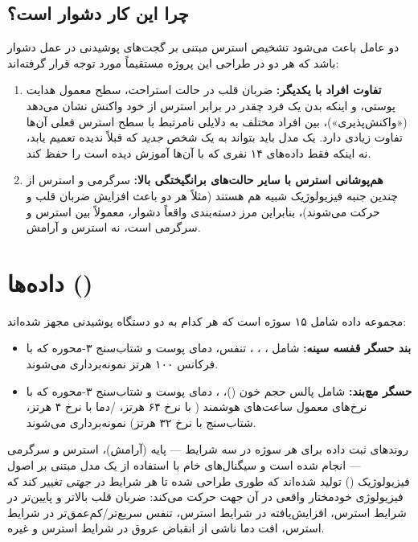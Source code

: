 \documentclass[12pt,a4paper]{article}
\begin{document}
\subsection{چرا این کار دشوار است؟}
دو عامل باعث می‌شود تشخیص استرس مبتنی بر گجت‌های پوشیدنی در عمل دشوار باشد که هر دو در طراحی این پروژه مستقیماً مورد توجه قرار گرفته‌اند:
\begin{enumerate}
    \item \textbf{تفاوت افراد با یکدیگر:} ضربان قلب در حالت استراحت، سطح معمول هدایت پوستی، و اینکه بدن یک فرد چقدر در برابر استرس از خود واکنش نشان می‌دهد («واکنش‌پذیری»)، بین افراد مختلف به دلایلی نامرتبط با سطح استرس فعلی آن‌ها تفاوت زیادی دارد. یک مدل باید بتواند به یک شخص \textit{جدید} که قبلاً ندیده تعمیم یابد، نه اینکه فقط داده‌های ۱۴ نفری که با آن‌ها آموزش دیده است را حفظ کند.
    \item \textbf{هم‌پوشانی استرس با سایر حالت‌های برانگیختگی بالا:} سرگرمی و استرس از چندین جنبه فیزیولوژیک شبیه هم هستند (مثلاً هر دو باعث افزایش ضربان قلب و حرکت می‌شوند)، بنابراین مرز دسته‌بندی واقعاً دشوار، معمولاً بین استرس و سرگرمی است، نه استرس و آرامش.
\end{enumerate}


\section{داده‌ها ()}
مجموعه داده شامل ۱۵ سوژه است که هر کدام به دو دستگاه پوشیدنی مجهز شده‌اند:
\begin{itemize}
    \item \textbf{بند حسگر قفسه سینه:} شامل ، ، ، تنفس، دمای پوست و شتاب‌سنج ۳-محوره که با فرکانس ۱۰۰ هرتز نمونه‌برداری می‌شوند.
    \item \textbf{حسگر مچ‌بند:} شامل پالس حجم خون ()، ، دمای پوست و شتاب‌سنج ۳-محوره که با نرخ‌های معمول ساعت‌های هوشمند ( با نرخ ۶۴ هرتز، /دما با نرخ ۴ هرتز، شتاب‌سنج با نرخ ۳۲ هرتز) نمونه‌برداری می‌شوند.
\end{itemize}

روندهای ثبت داده برای هر سوژه در سه شرایط — پایه (آرامش)، استرس و سرگرمی — انجام شده است و سیگنال‌های خام با استفاده از یک مدل مبتنی بر اصول فیزیولوژیک () تولید شده‌اند که طوری طراحی شده تا هر شرایط در \textit{جهتی} تغییر کند که فیزیولوژی خودمختار واقعی در آن جهت حرکت می‌کند: ضربان قلب بالاتر و  پایین‌تر در شرایط استرس،  افزایش‌یافته در شرایط استرس، تنفس سریع‌تر/کم‌عمق‌تر در شرایط استرس، افت دما ناشی از انقباض عروق در شرایط استرس و غیره.
\end{document}

